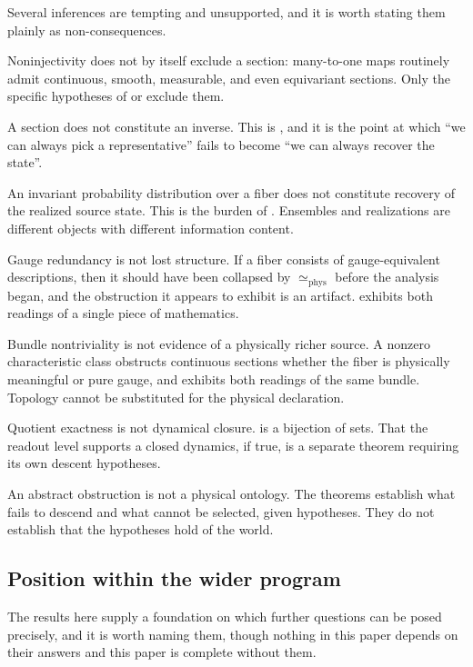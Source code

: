 \documentclass[11pt,reqno]{amsart}
\theoremstyle{plain}
\theoremstyle{definition}
\theoremstyle{remark}
\newcommand{\phe}{\simeq_{\mathrm{phys}}}
\begin{document}
Several inferences are tempting and unsupported, and it is worth stating them plainly as non-consequences.

Noninjectivity does not by itself exclude a section: many-to-one maps routinely admit continuous, smooth, measurable, and even equivariant sections. Only the specific hypotheses of  or  exclude them.

A section does not constitute an inverse. This is , and it is the point at which ``we can always pick a representative'' fails to become ``we can always recover the state''.

An invariant probability distribution over a fiber does not constitute recovery of the realized source state. This is the burden of . Ensembles and realizations are different objects with different information content.

Gauge redundancy is not lost structure. If a fiber consists of gauge-equivalent descriptions, then it should have been collapsed by $\phe$ before the analysis began, and the obstruction it appears to exhibit is an artifact.  exhibits both readings of a single piece of mathematics.

Bundle nontriviality is not evidence of a physically richer source. A nonzero characteristic class obstructs continuous sections whether the fiber is physically meaningful or pure gauge, and  exhibits both readings of the same bundle. Topology cannot be substituted for the physical declaration.

Quotient exactness is not dynamical closure.  is a bijection of sets. That the readout level supports a closed dynamics, if true, is a separate theorem requiring its own descent hypotheses.

An abstract obstruction is not a physical ontology. The theorems establish what fails to descend and what cannot be selected, given hypotheses. They do not establish that the hypotheses hold of the world.

\subsection{Position within the wider program}

The results here supply a foundation on which further questions can be posed precisely, and it is worth naming them, though nothing in this paper depends on their answers and this paper is complete without them.
\end{document}
